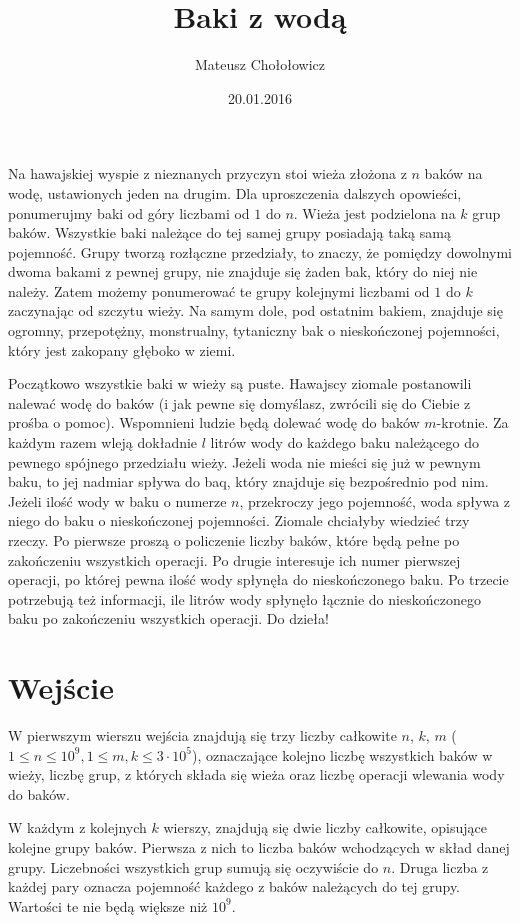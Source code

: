 \documentclass[zad,zawodnik,utf8]{sinol}
\title{Baki z wodą}
\author{Mateusz Chołołowicz} %
\date{20.01.2016}
\begin{document}
  \begin{tasktext}%
Na hawajskiej wyspie z nieznanych przyczyn stoi wieża złożona z $n$ baków na wodę, ustawionych jeden na drugim. 
Dla uproszczenia dalszych opowieści, ponumerujmy baki od góry liczbami od $1$ do $n$.
Wieża jest podzielona na $k$ grup baków. Wszystkie baki należące do tej samej grupy posiadają taką samą pojemność.
Grupy tworzą rozłączne przedziały, to znaczy, że pomiędzy dowolnymi dwoma bakami z pewnej grupy, nie znajduje
się żaden bak, który do niej nie należy. Zatem możemy ponumerować te grupy kolejnymi liczbami od $1$ do $k$ zaczynając od szczytu wieży.
Na samym dole, pod ostatnim bakiem, znajduje się ogromny, przepotężny, 
monstrualny, tytaniczny bak o nieskończonej pojemności, który jest zakopany głęboko w ziemi. 

 
Początkowo wszystkie baki w wieży są puste. Hawajscy ziomale postanowili nalewać wodę do baków (i jak pewne
się domyślasz, zwrócili się do Ciebie z prośba o pomoc). Wspomnieni ludzie
będą dolewać wodę do baków $m$-krotnie. Za każdym razem wleją dokładnie $l$ litrów wody do każdego baku należącego do
pewnego spójnego przedziału wieży. Jeżeli woda nie mieści się już w pewnym baku, to jej nadmiar spływa do baq, 
który znajduje się bezpośrednio pod nim. Jeżeli ilość wody w baku o numerze $n$, przekroczy jego pojemność, 
woda spływa z niego do baku o nieskończonej pojemności. Ziomale chciałyby wiedzieć
trzy rzeczy. Po pierwsze proszą o policzenie liczby baków, które będą pełne po zakończeniu wszystkich operacji.
Po drugie interesuje ich numer pierwszej operacji, po której pewna ilość wody spłynęła do nieskończonego baku.
Po trzecie potrzebują też informacji, ile litrów wody spłynęło łącznie do nieskończonego baku po zakończeniu wszystkich operacji. Do dzieła!

 \section{Wejście}
    
W pierwszym wierszu wejścia znajdują się trzy liczby całkowite $n$, $k$, $m$ ($1 \leq n \leq 10^9, 1 \leq m,k \leq 3 \cdot 10^5$), 
oznaczające kolejno liczbę wszystkich baków w wieży, liczbę grup, z których składa się wieża oraz liczbę operacji wlewania
wody do baków. 

W każdym z kolejnych $k$ wierszy, znajdują się dwie liczby całkowite, opisujące kolejne grupy baków. Pierwsza z nich to liczba
baków wchodzących w skład danej grupy. Liczebności wszystkich grup sumują się oczywiście do $n$. Druga liczba z każdej pary
oznacza pojemność każdego z baków należących do tej grupy. Wartości te nie będą większe niż $10^9$.


\end{tasktext}
\end{document}
